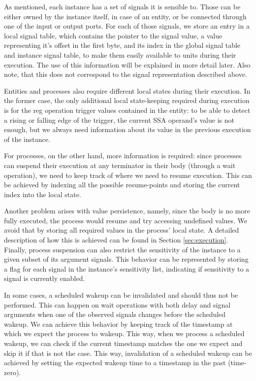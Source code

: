 As mentioned, each instance has a set of signals it is sensible to. Those can be either owned by the instance itself, in case of an entity, or be connected through one of the input or output ports. For each of those signals, we store an entry in a local signal table, which contains the pointer to the signal value, a value representing it's offset in the first byte, and its index in the global signal table and instance signal table, to make them easily available to units during their execution. The use of this information will be explained in more detail later. Also note, that this does not correspond to the signal representation described above.

Entities and processes also require different local states during their execution. In the former case, the only additional local state-keeping required during execution is for the reg operation trigger values contained in the entity: to be able to detect a rising or falling edge of the trigger, the current SSA operand's value is not enough, but we always need information about its value in the previous execution of the instance.

For processes, on the other hand, more information is required: since processes can suspend their execution at any terminator in their body (through a wait operation), we need to keep track of where we need to resume execution. This can be achieved by indexing all the possible resume-points and storing the current index into the local state.

Another problem arises with value persistence, namely, since the body is no more fully executed, the process would resume and try accessing undefined values. We avoid that by storing all required values in the process' local state. A detailed description of how this is achieved can be found in Section \ref{sec:execution}. Finally, process suspension can also restrict the sensitivity of the instance to a given subset of its argument signals. This behavior can be represented by storing a flag for each signal in the instance's sensitivity list, indicating if sensitivity to a signal is currently enabled.

In some cases, a scheduled wakeup can be invalidated and should thus not be performed. This can happen on wait operations with both delay and signal arguments when one of the observed signals changes before the scheduled wakeup. We can achieve this behavior by keeping track of the timestamp at which we expect the process to wakeup. This way, when we process a scheduled wakeup, we can check if the current timestamp matches the one we expect and skip it if that is not the case. This way, invalidation of a scheduled wakeup can be achieved by setting the expected wakeup time to a timestamp in the past (\eg time-zero).


